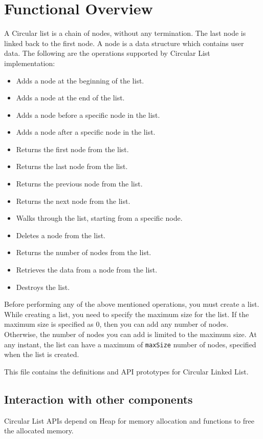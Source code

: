 \hypertarget{group__group38}{
\chapter{Functional Overview}
\label{group__group38}
}
\begin{flushleft}

A Circular list is a chain of nodes, without any termination. The last node is linked back to the first node. A node is a data structure which contains 
user data. The following are the operations supported by Circular List implementation: 
 \par
 \begin{itemize}
\item Adds a node at the beginning of the list. \item Adds a node at the end of the list. \item Adds a node before a specific node in the list. \item 
Adds a node after a specific node in the list. \item Returns the first node from the list. \item Returns the last node from the list. \item Returns the
previous node from the list. \item Returns the next node from the list. \item Walks through the list, starting from a specific node. \item Deletes a node 
from the list. \item Returns the number of nodes from the list. \item Retrieves the data from a node from the list. \item Destroys the list. 
 \par
\end{itemize}
Before performing any of the above mentioned operations, you must create a list. While creating a list, you need to specify the maximum size for the list. If the 
maximum size is specified as 0, then you can add any number of nodes. Otherwise, the number of nodes you can add is limited to the maximum size. At any 
instant, the list can have a maximum of {\tt{max\-Size}} number of nodes, specified when the list is created. 
 \par
 This file contains the definitions and API prototypes for Circular Linked List.
\section{Interaction with other components} Circular List APIs depend on Heap for memory allocation and functions to free the allocated memory. 


\end{flushleft}

